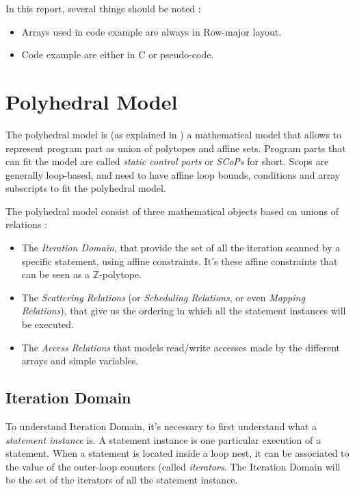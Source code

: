 \documentclass[paper=a4, fontsize=11pt]{scrartcl}
\numberwithin{equation}{section}        %
\numberwithin{figure}{section}          %
\numberwithin{table}{section}               %
\begin{document}
    In this report, several things should be noted :
    \begin{itemize}
        \item Arrays used in code example are always in Row-major layout.
        \item Code example are either in C or pseudo-code.
    \end{itemize}

\section{Polyhedral Model}
The polyhedral model is (as explained in \cite{Bas'12}) a mathematical model that allows to represent program
part as union of polytopes and affine sets. Program parts that can fit the model
are called \textit{static control parts} or \textit{SCoPs} for short.
Scops are generally loop-based, and need to have affine loop bounds, conditions and
array subscripts to fit the polyhedral model.

The polyhedral model consist of three mathematical objects based on unions of relations :
\begin{itemize}
    \item The \textit{Iteration Domain}, that provide the set of all the iteration scanned
        by a specific statement, using affine constraints. It's these affine constraints 
        that can be seen as a $\mathbb{Z}$-polytope.
    \item The \textit{Scattering Relations} (or \textit{Scheduling Relations},
        or even \textit{Mapping Relations}), that give us the ordering in which
        all the statement instances will be executed.
    \item The \textit{Access Relations} that models read/write accesses made by
        the different arrays and simple variables.
\end{itemize}

    \subsection{Iteration Domain}
        To understand Iteration Domain, it's necessary to first understand what a \textit{statement instance}
        is. A statement instance is one particular execution of a statement.
        When a statement is located inside a loop nest, it can be associated to the value
        of the outer-loop counters (called \textit{iterators}.
        The Iteration Domain will be the set of the iterators of all the statement
        instance.
\end{document}
